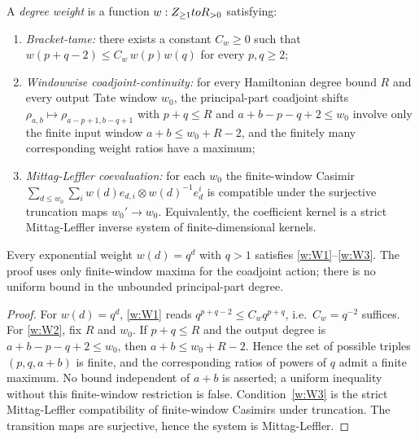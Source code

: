 \begin{defn}\label{defn:wt-degree-weight}
  A \emph{degree weight} is a function $w:Z_{\geq1}toR_{>0}$
  satisfying:
  \begin{enumerate}[label=(W\arabic*)]
    \item\label{w:W1} \emph{Bracket-tame:} there exists a constant
      $C_w\geq 0$ such that
      $w(p+q-2)\leq C_w\,w(p)w(q)$ for every $p,q\geq2$;
    \item\label{w:W2} \emph{Windowwise coadjoint-continuity:} for every
      Hamiltonian degree bound $R$ and every output Tate window
      $w_0$, the principal-part coadjoint shifts
      $\rho_{a,b}\mapsto\rho_{a-p+1,b-q+1}$ with $p+q\leq R$ and
      $a+b-p-q+2\leq w_0$ involve only the finite input window
      $a+b\leq w_0+R-2$, and the finitely many corresponding weight
      ratios have a maximum;
    \item\label{w:W3} \emph{Mittag-Leffler coevaluation:} for each
      $w_0$ the finite-window Casimir
      $\sum_{d\leq w_0}\sum_i w(d)e_{d,i}\otimes w(d)^{-1}e^i_d$
      is compatible under the surjective truncation maps
      $w_0'\to w_0$. Equivalently, the coefficient kernel is a strict
      Mittag-Leffler inverse system of finite-dimensional kernels.
  \end{enumerate}
\end{defn}

\begin{lem}\label{lem:wt-weights-exist}
  Every exponential weight $w(d)=q^d$ with $q>1$ satisfies
  \ref{w:W1}--\ref{w:W3}.  The proof uses only finite-window maxima
  for the coadjoint action; there is no uniform bound in the
  unbounded principal-part degree.
\end{lem}

\begin{proof}
  For $w(d)=q^d$, \ref{w:W1} reads $q^{p+q-2}\leq C_w q^{p+q}$, i.e.\
  $C_w=q^{-2}$ suffices.  For \ref{w:W2}, fix $R$ and $w_0$.  If
  $p+q\leq R$ and the output degree is
  $a+b-p-q+2\leq w_0$, then $a+b\leq w_0+R-2$.  Hence the set of
  possible triples $(p,q,a+b)$ is finite, and the corresponding
  ratios of powers of $q$ admit a finite maximum.  No bound independent
  of $a+b$ is asserted; a uniform inequality without this finite-window
  restriction is false.
  Condition~\ref{w:W3} is the strict Mittag-Leffler compatibility of
  finite-window Casimirs under truncation.  The transition maps are
  surjective, hence the system is Mittag-Leffler.
\end{proof}

